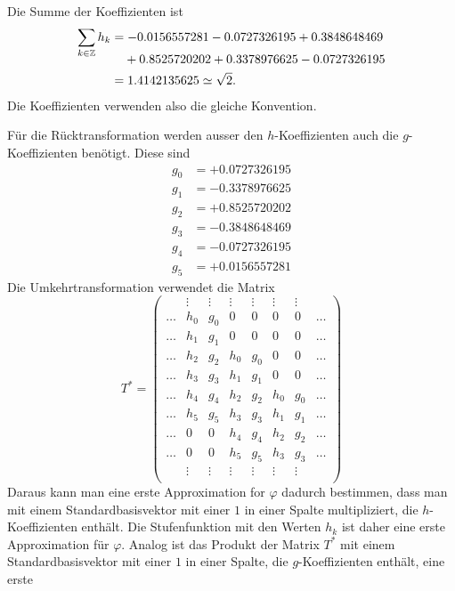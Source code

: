 \begin{loesung}
\begin{teilaufgaben}
\item
Die Summe der Koeffizienten ist
\begin{align*}
\sum_{k\in\mathbb Z}h_k
&=
-0.0156557281 -0.0727326195 + 0.3848648469\\[-8pt]
&\phantom{=\mathstrut} + 0.8525720202 + 0.3378976625 -0.0727326195
\\
&=1.4142135625
\simeq\sqrt{2}.
\end{align*}
Die Koeffizienten verwenden also die gleiche Konvention.
\item
Für die Rücktransformation werden ausser den $h$-Koeffizienten auch die
$g$-Koeffizienten benötigt.
Diese sind
\begin{align*}
g_0 &= +0.0727326195\\
g_1 &= -0.3378976625\\
g_2 &= +0.8525720202\\
g_3 &= -0.3848648469\\
g_4 &= -0.0727326195\\
g_5 &= +0.0156557281
\end{align*}
Die Umkehrtransformation verwendet die Matrix 
\[
T^*
=
\begin{pmatrix}
&\vdots&\vdots&\vdots&\vdots&\vdots&\vdots&\\
\dots&h_0&g_0& 0 & 0 & 0 & 0 &\dots\\
\dots&h_1&g_1& 0 & 0 & 0 & 0 &\dots\\
\dots&h_2&g_2&h_0&g_0& 0 & 0 &\dots\\
\dots&h_3&g_3&h_1&g_1& 0 & 0 &\dots\\
\dots&h_4&g_4&h_2&g_2&h_0&g_0&\dots\\
\dots&h_5&g_5&h_3&g_3&h_1&g_1&\dots\\
\dots& 0 & 0 &h_4&g_4&h_2&g_2&\dots\\
\dots& 0 & 0 &h_5&g_5&h_3&g_3&\dots\\
&\vdots&\vdots&\vdots&\vdots&\vdots&\vdots&\\
\end{pmatrix}
\]
Daraus kann man eine erste Approximation for $\varphi$ dadurch bestimmen,
dass man mit einem Standardbasisvektor mit einer $1$ in einer Spalte
multipliziert, die $h$-Koeffizienten enthält.
Die Stufenfunktion mit den Werten $h_k$ ist daher eine erste Approximation 
für $\varphi$.
Analog ist das Produkt der Matrix $T^*$ mit einem Standardbasisvektor
mit einer $1$ in einer Spalte, die $g$-Koeffizienten enthält, eine erste

\end{teilaufgaben}
\end{loesung}
